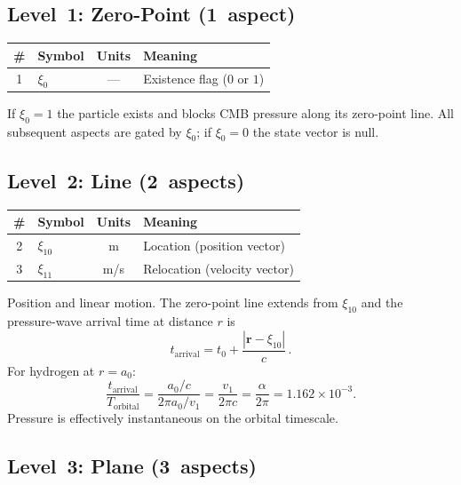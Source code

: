 \subsection{Level~1: Zero-Point (1~aspect)}

\begin{center}
\begin{tabular}{clcl}
\hline
\# & Symbol & Units & Meaning \\
\hline
1 & $\xi_0$ & --- & Existence flag ($0$ or $1$) \\
\hline
\end{tabular}
\end{center}

If $\xi_0 = 1$ the particle exists and blocks CMB pressure along its zero-point line.  All subsequent aspects are gated by $\xi_0$; if $\xi_0 = 0$ the state vector is null.


\subsection{Level~2: Line (2~aspects)}

\begin{center}
\begin{tabular}{clcl}
\hline
\# & Symbol & Units & Meaning \\
\hline
2 & $\xi_{10}$ & m & Location (position vector) \\
3 & $\xi_{11}$ & m/s & Relocation (velocity vector) \\
\hline
\end{tabular}
\end{center}

Position and linear motion.  The zero-point line extends from $\xi_{10}$ and the pressure-wave arrival time at distance $r$ is
\begin{equation}
  t_{\text{arrival}} = t_0 + \frac{|\mathbf{r} - \xi_{10}|}{c}\,.
\end{equation}
For hydrogen at $r = a_0$:
\begin{equation}
  \frac{t_{\text{arrival}}}{T_{\text{orbital}}}
    = \frac{a_0/c}{2\pi a_0/v_1}
    = \frac{v_1}{2\pi c}
    = \frac{\alpha}{2\pi}
    = 1.162 \times 10^{-3}.
\end{equation}
Pressure is effectively instantaneous on the orbital timescale.


\subsection{Level~3: Plane (3~aspects)}

